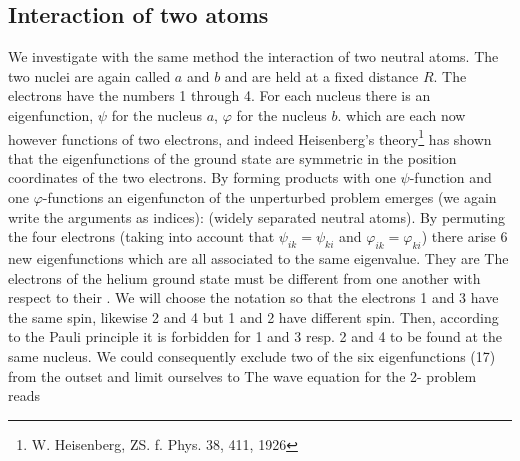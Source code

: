 \begin{paper}{1}
\section{Interaction of two  atoms} We investigate with the same method the interaction of two neutral  atoms. The two nuclei are again called $a$ and $b$ and are held at a fixed distance $R$. The electrons have the numbers 1 through 4. For each nucleus there is an eigenfunction, $\psi$ for the nucleus $a$, $\varphi$ for the nucleus $b$. which are each now however functions of two electrons, and indeed Heisenberg's  theory\footnote{W. Heisenberg, ZS. f. Phys. 38, 411, 1926} has shown that the eigenfunctions of the  ground state are symmetric in the position coordinates of the two electrons. By forming products with one $\psi$-function and one $\varphi$-functions an eigenfuncton of the unperturbed problem emerges (we again write the arguments as indices):
(widely separated neutral atoms). By permuting the four electrons (taking into account that $\psi_{ik}=\psi_{ki}$ and $\varphi_{ik}=\varphi_{ki}$) there arise 6 new eigenfunctions which are all associated to the same eigenvalue. They are
The electrons of the helium ground state must be different from one another with respect to their . We will choose the notation so that the electrons 1 and 3 have the same spin, likewise 2 and 4 but 1 and 2 have different spin. Then, according to the Pauli principle it is forbidden for 1 and 3 resp. 2 and 4 to be found at the same  nucleus. We could consequently exclude two of the six eigenfunctions (17) from the outset and limit ourselves to
The wave equation for the 2- problem reads


\end{paper}
